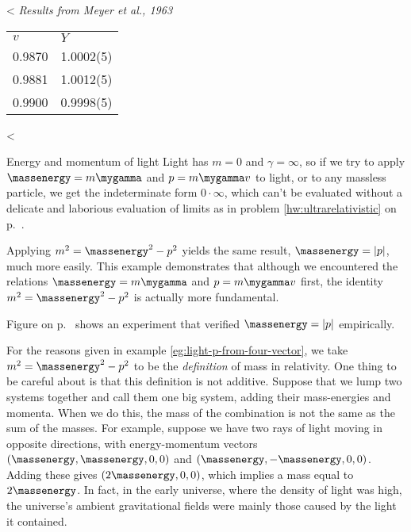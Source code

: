 <%
\noindent\emph{Results from Meyer et al., 1963}

\begin{tabular}{ll}
  $v$ & $Y$ \\
  0.9870 & 1.0002(5) \\
  0.9881 & 1.0012(5) \\
  0.9900 & 0.9998(5)
\end{tabular}
<%

\begin{eg}{Energy and momentum of light}\label{eg:light-p-from-four-vector}
Light has $m=0$ and $\gamma=\infty$, so if we try to apply $\massenergy=m\mygamma$ and $p=m\mygamma v$ to light,
or to any massless particle, we get the indeterminate form $0\cdot\infty$, which can't be evaluated without
a delicate and laborious evaluation of limits as in problem \ref{hw:ultrarelativistic}
on p.~\pageref{hw:ultrarelativistic}.

Applying $m^2 = \massenergy^2 - p^2$ yields the same result, $\massenergy=|p|$, much more easily. This example
demonstrates that although we encountered the relations $\massenergy=m\mygamma$ and $p=m\mygamma v$ first,
the identity $m^2 = \massenergy^2 - p^2$ is actually more fundamental.

Figure  on p.~\pageref{fig:nichols-radiometer} shows an experiment
that verified $\massenergy=|p|$ empirically.
\end{eg}

For the reasons given in example \ref{eg:light-p-from-four-vector}, we take
$m^2 = \massenergy^2 - p^2$ to be the \emph{definition} of mass in relativity.
One thing to be careful about is that this definition is not additive. Suppose that we lump
two systems together and call them one big system, adding their mass-energies and momenta.
When we do this, the mass of the combination is not the same as  the sum of the masses.
For example, suppose we have two rays of light moving in opposite directions, with
energy-momentum vectors $(\massenergy,\massenergy,0,0)$ and $(\massenergy,-\massenergy,0,0)$.
Adding these gives $(2\massenergy,0,0)$, which implies a mass equal to $2\massenergy$. In
fact, in the early universe, where the density of light was high, the universe's ambient
gravitational fields were mainly those caused by the light it contained.

